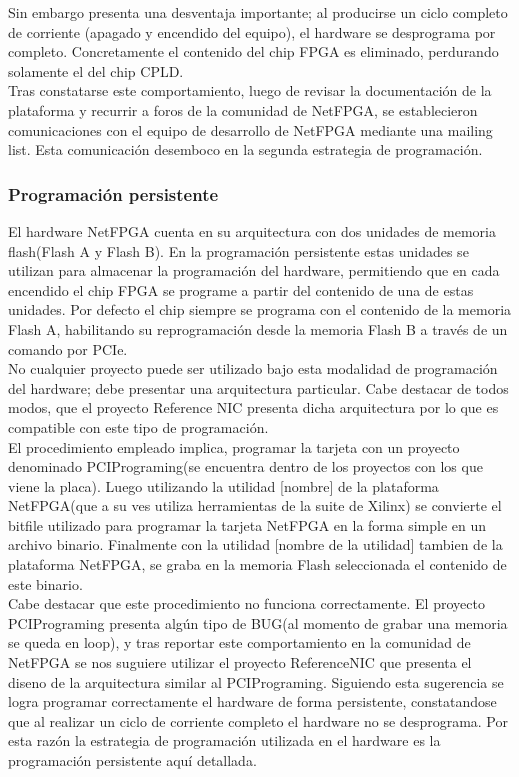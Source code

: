 Sin embargo presenta una desventaja importante; al producirse un ciclo completo de corriente (apagado y encendido del equipo), el hardware se desprograma por completo. Concretamente el contenido del chip FPGA es eliminado, perdurando solamente el del chip CPLD.\\

Tras constatarse este comportamiento, luego de revisar la documentaci\'on de la plataforma y recurrir a foros de la comunidad de NetFPGA, se establecieron comunicaciones con el equipo de desarrollo de NetFPGA mediante una mailing list. Esta comunicaci\'on desemboco en la segunda estrategia de programaci\'on.

\subsubsection{Programaci\'on persistente}
El hardware NetFPGA cuenta en su arquitectura con dos unidades de memoria flash(Flash A y Flash B). En la programaci\'on persistente estas unidades se utilizan para almacenar la programaci\'on del hardware, permitiendo que en cada encendido el chip FPGA se programe a partir del contenido de una de estas unidades. Por defecto el chip siempre se programa con el contenido de la memoria Flash A, habilitando su reprogramaci\'on desde la memoria Flash B a trav\'es de un comando por PCIe.\\

No cualquier proyecto puede ser utilizado bajo esta modalidad de programaci\'on del hardware; debe presentar una arquitectura particular. Cabe destacar de todos modos, que el proyecto Reference NIC presenta dicha arquitectura por lo que es compatible con este tipo de programaci\'on.\\

El procedimiento empleado implica, programar la tarjeta con un proyecto denominado PCIPrograming(se encuentra dentro de los proyectos con los que viene la placa). Luego utilizando la utilidad [nombre] de la plataforma NetFPGA(que a su ves utiliza herramientas de la suite de Xilinx) se convierte el bitfile utilizado para programar la tarjeta NetFPGA en la forma simple en un archivo binario. Finalmente con la utilidad [nombre de la utilidad] tambien de la plataforma NetFPGA, se graba en la memoria Flash seleccionada el contenido de este binario.\\

Cabe destacar que este procedimiento no funciona correctamente. El proyecto PCIPrograming presenta alg\'un tipo de BUG(al momento de grabar una memoria se queda en loop), y tras reportar este comportamiento en la comunidad de NetFPGA se nos suguiere utilizar el proyecto ReferenceNIC que presenta el diseno de la arquitectura similar al PCIPrograming. Siguiendo esta sugerencia se logra programar correctamente el hardware de forma persistente, constatandose que al realizar un ciclo de corriente completo el hardware no se desprograma. Por esta raz\'on la estrategia de programaci\'on utilizada en el hardware es la programaci\'on persistente aqu\'i detallada.\\

